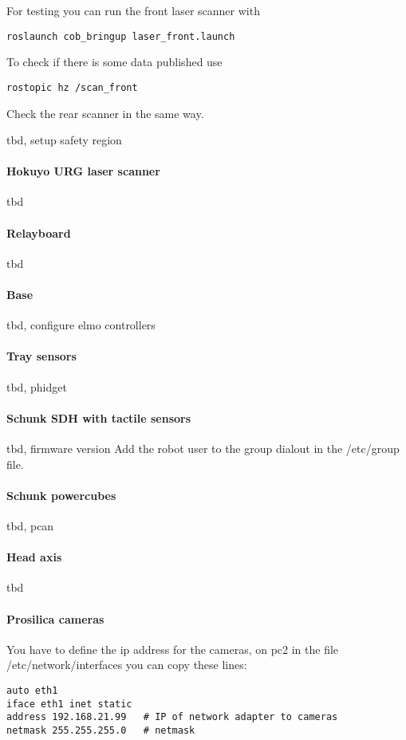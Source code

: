 For testing you can run the front laser scanner with
\begin{lstlisting}
roslaunch cob_bringup laser_front.launch
\end{lstlisting}

To check if there is some data published use
\begin{lstlisting}
rostopic hz /scan_front
\end{lstlisting}

Check the rear scanner in the same way.

tbd, setup safety region

\paragraph{Hokuyo URG laser scanner}
tbd

\paragraph{Relayboard}
tbd

\paragraph{Base}
tbd, configure elmo controllers

\paragraph{Tray sensors}
tbd, phidget

\paragraph{Schunk SDH with tactile sensors}
tbd, firmware version
Add the robot user to the group dialout in the /etc/group file.

\paragraph{Schunk powercubes}
tbd, pcan

\paragraph{Head axis}
tbd

\paragraph{Prosilica cameras}
You have to define the ip address for the cameras, on pc2 in the file /etc/network/interfaces you can copy these lines:
\begin{lstlisting}
auto eth1 
iface eth1 inet static
address 192.168.21.99   # IP of network adapter to cameras 
netmask 255.255.255.0   # netmask
\end{lstlisting}

